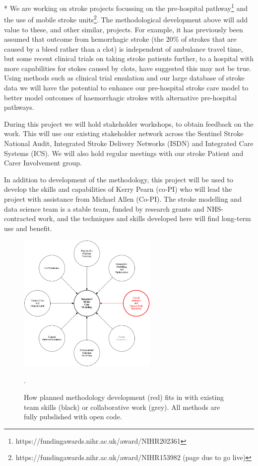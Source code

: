 * We are working on stroke projects focussing on the pre-hospital pathway\footnote{https://fundingawards.nihr.ac.uk/award/NIHR202361} and the use of mobile stroke units\footnote{https://fundingawards.nihr.ac.uk/award/NIHR153982 (page due to go live)}. The methodological development above will add value to these, and other similar, projects. For example, it has previously been assumed that outcome from hemorrhagic stroke (the 20\% of strokes that are caused by a bleed rather than a clot) is independent of ambulance travel time, but some recent clinical trials on taking stroke patients further, to a hospital with more capabilities for stokes caused by clots, have suggested this may not be true. Using methods such as clinical trial emulation and our large database of stroke data we will have the potential to enhance our pre-hospital stroke care model to better model outcomes of haemorrhagic strokes with alternative pre-hospital pathways.

During this project we will hold stakeholder workshops, to obtain feedback on the work. This will use our existing stakeholder network across the Sentinel Stroke National Audit, Integrated Stroke Delivery Networks (ISDN) and Integrated Care Systems (ICS). We will also hold regular meetings with our stroke Patient and Carer Involvement group.

In addition to development of the methodology, this project will be used to develop the skills and capabilities of Kerry Pearn (co-PI) who will lead the project with assistance from Michael Allen (Co-PI). The stroke modelling and data science team is a stable team, funded by research grants and NHS-contracted work, and the techniques and skills developed here will find long-term use and benefit.


\begin{figure}[htbp]
\centering
\includegraphics[width=0.6\textwidth]{./images/skills}
\caption{How planned methodology development (red) fits in with existing team skills (black) or collaborative work (grey). All methods are fully pubslished with open code.}.
\label{fig:expertise}
\end{figure}
